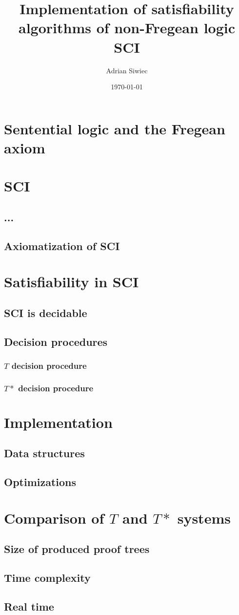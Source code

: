 \documentclass{article}
\title{Implementation of satisfiability algorithms of non-Fregean logic SCI}
\author{Adrian Siwiec}
\theoremstyle{definition}
\begin{document}
\date{\today}

\maketitle

\section{Sentential logic and the Fregean axiom}
\section{SCI}
\subsection{...}
\subsection{Axiomatization of SCI}
\section{Satisfiability in SCI}
\subsection{SCI is decidable}
\subsection{Decision procedures}
\subsubsection{$T$ decision procedure}
\subsubsection{$T*$ decision procedure}
\section{Implementation}
\subsection{Data structures}
\subsection{Optimizations}
\section{Comparison of $T$ and $T*$ systems}
\subsection{Size of produced proof trees}
\subsection{Time complexity}
\subsection{Real time}
\end{document}
